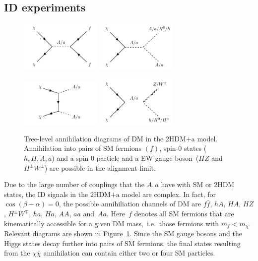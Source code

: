 \documentclass[a4paper, 11pt,notoc]{article}
\newcommand{\hdma}{\ensuremath{\textrm{2HDM+a}}\xspace}
\begin{document}
\subsection{ID experiments}

\begin{figure}[t!]
\centering
\includegraphics[width=0.35\textwidth]{graph_2hdm_relic_s_fermions.pdf} \qquad 
\includegraphics[width=0.35\textwidth]{graph_2hdm_relic_s_bosons.pdf} 

\vspace{5mm}

\includegraphics[width=0.35\textwidth]{graph_2hdm_relic_ss_bosons.pdf} \qquad 
\includegraphics[width=0.35\textwidth]{graph_2hdm_relic_s_vbosons.pdf}
\vspace{4mm}
\caption{Tree-level annihilation diagrams of DM in the \hdma model. Annihilation into pairs of SM fermions $(f)$, spin-0 states ($h, H,A,a$) and a spin-0 particle and a EW gauge boson~($HZ$ and $H^\pm W^\pm$) are possible in the alignment limit.}
\label{fig:feyn_annihilation}
\end{figure}

Due to the large number of couplings that the $A, a$ have with SM or 2HDM states, the ID signals in the \hdma model are  complex. In fact, for~$\cos (\beta - \alpha) = 0$, the possible annihiliation channels of DM are $ f \bar f$, $hA$, $HA$, $HZ$,  $H^\pm W^\mp$, $ha$, $Ha$, $AA$, $aa$ and~$Aa$.  Here~$f$ denotes all SM fermions that are kinematically accessible for a given DM mass,~i.e.~those fermions with $m_f < m_\chi$. Relevant diagrams are shown in Figure~\ref{fig:feyn_annihilation}. Since the SM gauge bosons and the Higgs states decay further into pairs of SM fermions, the final states resulting from the $\chi \bar \chi$ annihilation can contain either two or four SM particles. 
\end{document}
